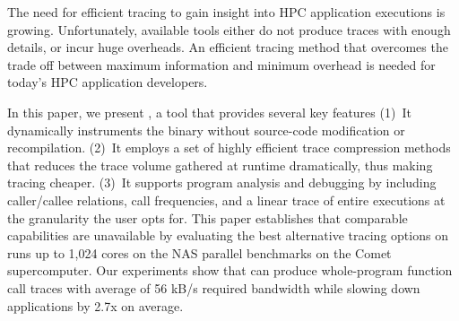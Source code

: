 The need for efficient tracing to gain insight into
HPC application executions is growing. 
%
Unfortunately, available tools either do not produce traces with enough details,
or incur huge overheads.
%
An efficient  tracing method that overcomes the trade off
between maximum information and minimum overhead
is needed for today's HPC application developers.
% 

In this paper, we present \parlot, a tool that provides several key
features (1)~It dynamically instruments the binary without source-code modification or recompilation.
%
(2)~It employs a set of highly efficient trace compression methods that reduces the trace volume gathered at runtime dramatically, thus making tracing cheaper.
%
(3)~It supports program analysis and debugging by
including caller/callee
relations, call frequencies, and a linear trace of entire executions
at the granularity the user opts for.
%
This paper establishes that comparable capabilities are 
unavailable by evaluating the best alternative tracing options
on runs up to 1,024 cores on the NAS parallel benchmarks on the
Comet supercomputer.
%
Our experiments show that \parlot can produce whole-program function 
call traces with average of 56 kB/s required bandwidth while 
slowing down applications by 2.7x on average. 
